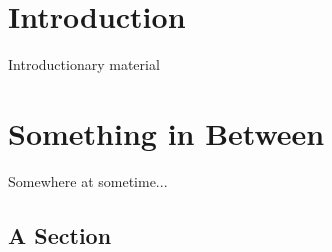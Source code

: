 \documentclass[dejavu]{ituthesis}
\begin{document}

\frontmatter

\thetitlepage
\newpage

\begin{abstract}
This is an English abstract. English is the default language of this document.
\end{abstract}

\begin{otherlanguage}{danish}
  \begin{abstract}
    Dette er et resumé på dansk, som er det alternative sprog i dokumentet.
  \end{abstract}
\end{otherlanguage}

\cleardoublepage
\setcounter{tocdepth}{1}
\tableofcontents

\mainmatter

\midsloppy
\sloppybottom

\chapter{Introduction}
Introductionary material

\chapter{Something in Between}
Somewhere at sometime...

\section{A Section}
\end{document}
